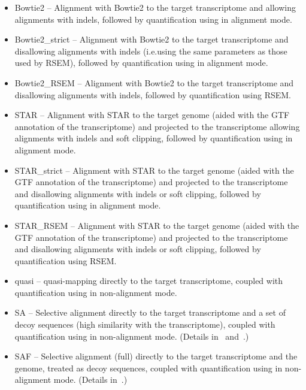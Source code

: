 \begin{itemize}
\item Bowtie2 -- Alignment with Bowtie2 to the target transcriptome and allowing alignments with indels,
  followed by quantification using \salmon in alignment mode.

\item Bowtie2\_strict -- Alignment with Bowtie2 to the target transcriptome and disallowing alignments with indels (i.e.\@ using the same parameters as those used by RSEM), followed by quantification using \salmon in alignment mode.

\item Bowtie2\_RSEM -- Alignment with Bowtie2 to the target transcriptome and disallowing alignments with indels, followed by quantification using RSEM.

\item STAR -- Alignment with STAR to the target genome (aided with the GTF annotation of the transcriptome) and projected to the transcriptome allowing alignments with indels and soft clipping, followed by quantification using \salmon in alignment mode.

\item STAR\_strict -- Alignment with STAR to the target genome (aided with the GTF annotation of the transcriptome) and projected to the transcriptome and disallowing alignments with indels or soft clipping, followed by quantification using \salmon in alignment mode.

\item STAR\_RSEM -- Alignment with STAR to the target genome (aided with the GTF annotation of the transcriptome) and projected to the transcriptome and disallowing alignments with indels or soft clipping, followed by quantification using RSEM.

\item quasi -- quasi-mapping directly to the target transcriptome, coupled with quantification using \salmon in non-alignment mode.

\item SA -- Selective alignment directly to the target transcriptome and a set of decoy sequences (high similarity with the transcriptome), coupled with quantification using \salmon in non-alignment mode. (Details in~ and~.)

\item SAF -- Selective alignment (full) directly to the target transcriptome and the genome, treated as decoy sequences, coupled with quantification using \salmon in non-alignment mode. (Details in~.)

\end{itemize}

